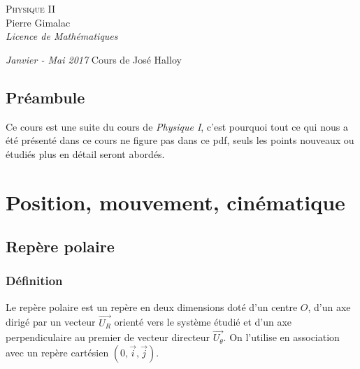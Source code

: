 \documentclass[a4paper,10pt]{book} %
\begin{document}
\begin{titlepage}
\thispagestyle{empty}
\begin{center}
\vspace*{7cm}
\Huge \textsc{Physique II}\\
\vspace{1.5cm}
\Large Pierre Gimalac\\
\vspace{0.5cm}
\large \textit{Licence de Mathématiques}
\vfill
\end{center}
\large \textit{Janvier - Mai 2017}
\hfill 
\large Cours de José Halloy
\restoregeometry
\end{titlepage}

\renewcommand{\contentsname}{Sommaire}
\thispagestyle{empty}
\tableofcontents
\thispagestyle{empty}

\section*{Préambule}
Ce cours est une suite du cours de \textit{Physique I}, c'est pourquoi tout ce qui nous a été présenté dans ce cours ne figure pas dans ce pdf, seuls les points nouveaux ou étudiés plus en détail seront abordés.

\chapter{Position, mouvement, cinématique}
\section{Repère polaire}
\subsection{Définition}
Le repère polaire est un repère en deux dimensions doté d'un centre $O$, d'un axe dirigé par un vecteur $\overrightarrow{U_R}$ orienté vers le système étudié et d'un axe perpendiculaire au premier de vecteur directeur $\overrightarrow{U_\theta}$. On l'utilise en association avec un repère cartésien $(0,\overrightarrow{i},\overrightarrow{j})$.
\end{document}
